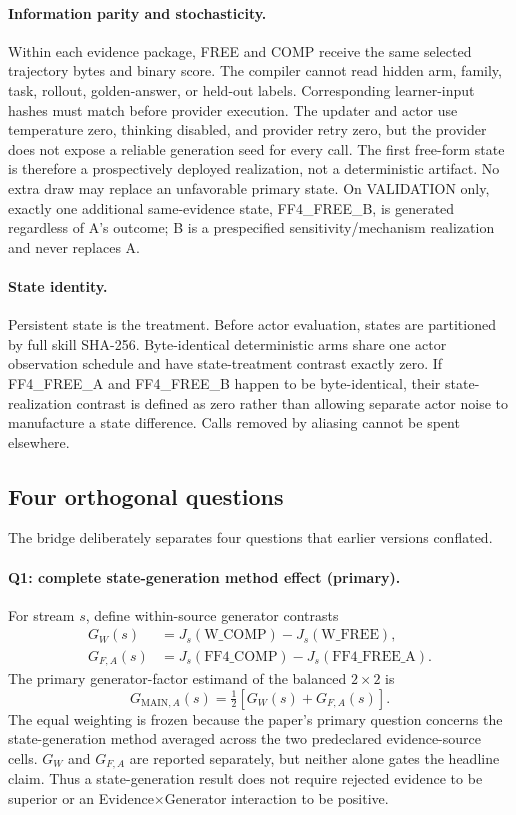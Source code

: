 \paragraph{Information parity and stochasticity.}
Within each evidence package, FREE and COMP receive the same selected trajectory bytes and binary score. The compiler cannot read hidden arm, family, task, rollout, golden-answer, or held-out labels. Corresponding learner-input hashes must match before provider execution. The updater and actor use temperature zero, thinking disabled, and provider retry zero, but the provider does not expose a reliable generation seed for every call. The first free-form state is therefore a prospectively deployed realization, not a deterministic artifact. No extra draw may replace an unfavorable primary state. On VALIDATION only, exactly one additional same-evidence state, FF4\_FREE\_B, is generated regardless of A's outcome; B is a prespecified sensitivity/mechanism realization and never replaces A.

\paragraph{State identity.}
Persistent state is the treatment. Before actor evaluation, states are partitioned by full skill SHA-256. Byte-identical deterministic arms share one actor observation schedule and have state-treatment contrast exactly zero. If FF4\_FREE\_A and FF4\_FREE\_B happen to be byte-identical, their state-realization contrast is defined as zero rather than allowing separate actor noise to manufacture a state difference. Calls removed by aliasing cannot be spent elsewhere.

\subsection{Four orthogonal questions}
The bridge deliberately separates four questions that earlier versions conflated.

\paragraph{Q1: complete state-generation method effect (primary).}
For stream $s$, define within-source generator contrasts
\begin{align}
G_W(s) &= J_s(\text{W\_COMP})-J_s(\text{W\_FREE}),\\
G_{F,A}(s) &= J_s(\text{FF4\_COMP})-J_s(\text{FF4\_FREE\_A}).
\end{align}
The primary generator-factor estimand of the balanced $2\times2$ is
\begin{equation}
G_{\mathrm{MAIN},A}(s)=\tfrac{1}{2}\left[G_W(s)+G_{F,A}(s)\right].
\end{equation}
The equal weighting is frozen because the paper's primary question concerns the state-generation method averaged across the two predeclared evidence-source cells. $G_W$ and $G_{F,A}$ are reported separately, but neither alone gates the headline claim. Thus a state-generation result does not require rejected evidence to be superior or an Evidence$\times$Generator interaction to be positive.

